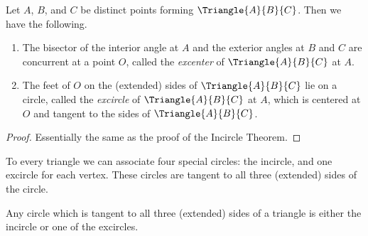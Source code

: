 \documentclass{article}
\begin{document}
\begin{construct}
Let $A$, $B$, and $C$ be distinct points forming $\Triangle{A}{B}{C}$. Then we have the following.
\begin{enumerate}
\item The bisector of the interior angle at $A$ and the exterior angles at $B$ and $C$ are concurrent at a point $O$, called the \emph{excenter} of $\Triangle{A}{B}{C}$ at $A$.

\item The feet of $O$ on the (extended) sides of $\Triangle{A}{B}{C}$ lie on a circle, called the \emph{excircle} of $\Triangle{A}{B}{C}$ at $A$, which is centered at $O$ and tangent to the sides of $\Triangle{A}{B}{C}$.
\end{enumerate}
\end{construct}

\begin{proof}
Essentially the same as the proof of the Incircle Theorem.
\end{proof}

To every triangle we can associate four special circles: the incircle, and one excircle for each vertex. These circles are tangent to all three (extended) sides of the circle.

\begin{prop}
Any circle which is tangent to all three (extended) sides of a triangle is either the incircle or one of the excircles.
\end{prop}
\end{document}
